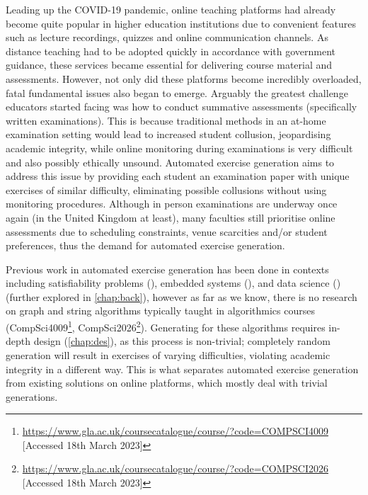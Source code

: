 \documentclass{l4proj}
\begin{document}
Leading up the COVID-19 pandemic, online teaching platforms had already become quite popular in higher education institutions due to convenient features such as lecture recordings, quizzes and online communication channels. As distance teaching had to be adopted quickly in accordance with government guidance, these services became essential for delivering course material and assessments. However, not only did these platforms become incredibly overloaded, fatal fundamental issues also began to emerge. Arguably the greatest challenge educators started facing was how to conduct summative assessments (specifically written examinations). This is because traditional methods in an at-home examination setting would lead to increased student collusion, jeopardising academic integrity, while online monitoring during examinations is very difficult and also possibly ethically unsound. Automated exercise generation aims to address this issue by providing each student an examination paper with unique exercises of similar difficulty, eliminating possible collusions without using  monitoring procedures. Although in person examinations are underway once again (in the United Kingdom at least), many faculties still prioritise online assessments due to scheduling constraints, venue scarcities and/or student preferences, thus the demand for automated exercise generation.

Previous work in automated exercise generation has been done in contexts including satisfiability problems (\cite{Hoz21}), embedded systems  (\cite{Sad12}), and data science (\cite{Kot19}) (further explored in \autoref{chap:back}), however as far as we know, there is no research on graph and string algorithms typically taught in algorithmics courses (CompSci4009\footnote{\url{https://www.gla.ac.uk/coursecatalogue/course/?code=COMPSCI4009} [Accessed 18th March 2023]}, CompSci2026\footnote{\url{https://www.gla.ac.uk/coursecatalogue/course/?code=COMPSCI2026} [Accessed 18th March 2023]}). Generating for these algorithms requires in-depth design (\autoref{chap:des}), as this process is non-trivial; completely random generation will result in exercises of varying difficulties, violating academic integrity in a different way. This is what separates automated exercise generation from existing solutions on online platforms, which mostly deal with trivial generations.
\end{document}
